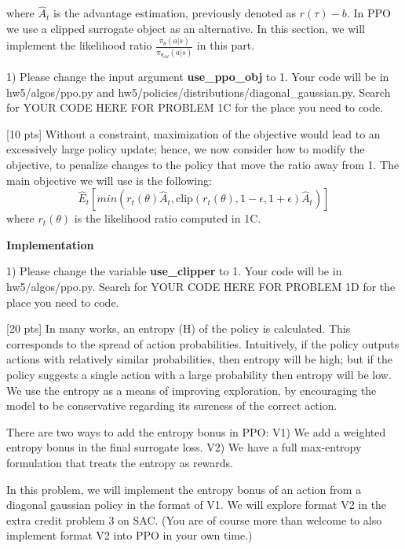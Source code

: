 \documentclass{article}
\begin{document}
where $\hat{A}_t$ is the advantage estimation, previously denoted as $r(\tau)-b$. In PPO we use a clipped surrogate object as an alternative. In this section, we will implement the likelihood ratio $\frac{\pi_\theta(a|s)}{\pi_{\theta_{old}}(a|s)}$ in this part.


1) Please change the input argument {\bf use\_ppo\_obj} to 1. Your code will be in hw5/algos/ppo.py and hw5/policies/distributions/diagonal\_gaussian.py. Search for YOUR CODE HERE FOR PROBLEM 1C for the place you need to code.
 
 
 
 \vskip 0.5in
 [10 pts]  Without a constraint, maximization of the objective would lead to an excessively large policy update; hence, we now consider how to modify the objective, to penalize changes to the policy that move the ratio away from 1. The main objective we will use is the following:
 $$
\hat{E}_t[min(r_t(\theta)\hat{A}_t, \text{clip}(r_t(\theta), 1-\epsilon, 1+\epsilon)\hat{A}_t)]
 $$
 where $r_t(\theta)$ is the likelihood ratio computed in 1C.
 
 {\bf Implementation} 
 
 1) Please change the variable {\bf use\_clipper} to 1. Your code will be in hw5/algos/ppo.py. Search for YOUR CODE HERE FOR PROBLEM 1D for the place you need to code.
 
 \vskip 0.5in
 
 [20 pts] In many works, an entropy (H) of the policy is calculated. This corresponds to the spread of action probabilities. Intuitively, if the policy outputs actions with relatively similar probabilities, then entropy will be high; but if the policy suggests a single action with a large probability then entropy will be low. We use the entropy as a means of improving exploration, by encouraging the model to be conservative regarding its sureness of the correct action. 

There are two ways to add the entropy bonus in PPO: V1) We add a weighted entropy bonus in the final surrogate loss.  V2) We have a full max-entropy formulation that treats the entropy as rewards.  
 
 In this problem, we will implement the entropy bonus of an action from a diagonal gaussian policy in the format of V1. We will explore format V2 in the extra credit problem 3 on SAC. (You are of course more than welcome to also implement format V2 into PPO in your own time.)
 
\end{document}
